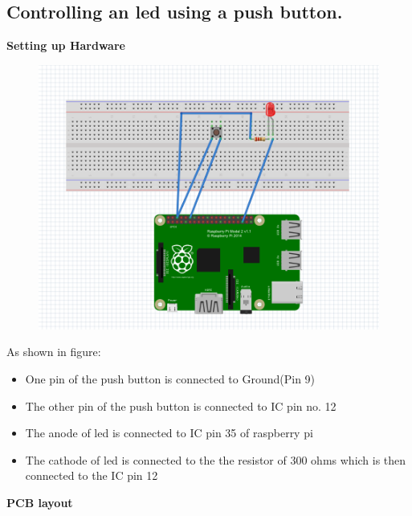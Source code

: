 \documentclass[11pt,a4paper]{article}
\begin{document}
	 \subsection{ Controlling an led using a push button.}
	 \textbf{Setting up Hardware}		
		\begin{figure}[h!]
			\includegraphics[scale=0.4]{GPIO.png}
			\centering
		\end{figure}
		As shown in figure:
		\begin{itemize}
			\item One pin of the push button is connected to Ground(Pin 9)
			\item The other pin of the push button is connected to IC pin no. 12
			\item The anode of led is connected to IC pin 35 of raspberry pi
			\item The cathode of led is connected to the the resistor of 300 ohms which is then connected to the IC pin 12
		\end{itemize}
		\textbf{PCB layout}
		
\end{document}
